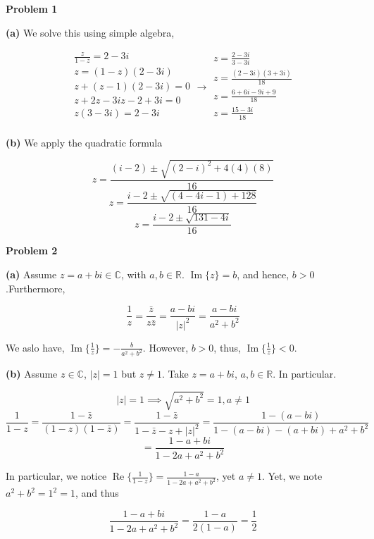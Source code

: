 \documentclass[12pt]{article}
\newcommand{\R}{\mathbb{R}}
\newcommand{\C}{\mathbb{C}}
\DeclareMathOperator{\Ima}{Im}
\DeclareMathOperator{\Rea}{Re}
\begin{document}
\textbf{Problem 1}

\textbf{(a)}
We solve this using simple algebra,

\begin{equation}
  \begin{split}
    \frac{z}{1-z} = 2-3i\\
    z = (1-z)(2-3i)\\
    z + (z-1)(2-3i) = 0\\
    z + 2z - 3iz - 2 + 3i = 0\\
    z(3-3i) = 2-3i\\
  \end{split}
  \rightarrow
  \begin{split}
    z = \frac{2-3i}{3-3i}\\
    z = \frac{(2-3i)(3+3i)}{18}\\
    z = \frac{6+6i-9i+9}{18}\\
    z = \frac{15-3i}{18}\\
  \end{split}
\end{equation}

\textbf{(b)}
We apply the quadratic formula

$$z = \frac{(i-2) \pm \sqrt{(2-i)^{2} + 4(4)(8)}}{16}$$
$$z = \frac{i-2 \pm \sqrt{(4-4i-1) + 128}}{16}$$
$$z = \frac{i-2 \pm \sqrt{131-4i}}{16}$$

\textbf{Problem 2}

\textbf{(a)}
Assume $z = a+bi \in \C$, with $a,b\in\R$. $\Ima\{z\} = b$, and hence, $b > 0$.Furthermore,

$$\frac{1}{z} = \frac{\bar{z}}{z\bar{z}} = \frac{a-bi}{|z|^{2}} = \frac{a-bi}{a^{2}+b^{2}}$$

We aslo have, $\Ima\{\frac{1}{z}\} = -\frac{b}{a^{2}+b^{2}}$. However, $b>0$, thus, $\Ima \{\frac{1}{z}\} < 0$.

\textbf{(b)}
Assume $z\in \C$, $|z| = 1$ but $z \neq 1$. Take $z = a+bi$, $a,b \in \R$. In particular.

$$|z| = 1 \implies \sqrt{a^{2} + b^{2}} = 1 , a \neq 1$$
$$\frac{1}{1-z} = \frac{1-\bar{z}}{(1-z)(1-\bar{z})} = \frac{1-\bar{z}}{1-\bar{z}-z+|z|^{2}} = \frac{1 -(a-bi)}{1-(a-bi)-(a+bi)+a^{2}+b^{2}}$$
$$ = \frac{1-a+bi}{1-2a+a^{2}+b^{2}} $$

In particular, we notice $\Rea \{\frac{1}{1-z} \} = \frac{1-a}{1-2a+a^{2}+b^{2}}$, yet $a \neq 1$. Yet, we note $a^{2} + b^{2}  = 1^{2} = 1$, and thus

$$\frac{1-a+bi}{1-2a+a^{2}+b^{2}} = \frac{1-a}{2(1-a)} = \frac{1}{2} $$
\end{document}
